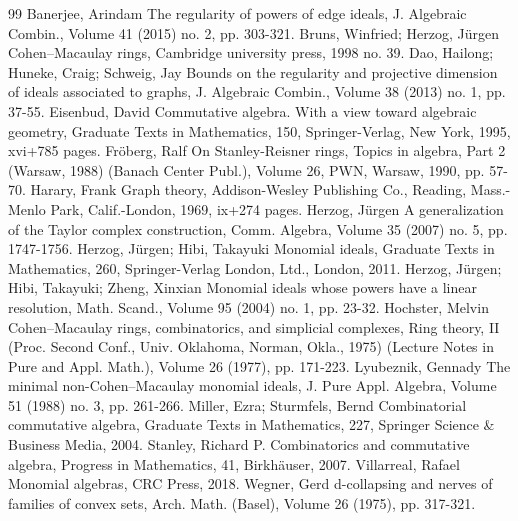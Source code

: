 \begin{thebibliography}{99}
 Banerjee, Arindam The regularity of powers of edge ideals, J. Algebraic Combin., Volume 41 (2015) no. 2, pp. 303-321.
 Bruns, Winfried; Herzog, Jürgen Cohen–Macaulay rings, Cambridge university press, 1998 no. 39.
 Dao, Hailong; Huneke, Craig; Schweig, Jay Bounds on the regularity and projective dimension of ideals associated to graphs, J. Algebraic Combin., Volume 38 (2013) no. 1, pp. 37-55.
 Eisenbud, David Commutative algebra. With a view toward algebraic geometry, Graduate Texts in Mathematics, 150, Springer-Verlag, New York, 1995, xvi+785 pages.
 Fröberg, Ralf On Stanley-Reisner rings, Topics in algebra, Part 2 (Warsaw, 1988) (Banach Center Publ.), Volume 26, PWN, Warsaw, 1990, pp. 57-70.
 Harary, Frank Graph theory, Addison-Wesley Publishing Co., Reading, Mass.-Menlo Park, Calif.-London, 1969, ix+274 pages.
 Herzog, Jürgen A generalization of the Taylor complex construction, Comm. Algebra, Volume 35 (2007) no. 5, pp. 1747-1756.
 Herzog, Jürgen; Hibi, Takayuki Monomial ideals, Graduate Texts in Mathematics, 260, Springer-Verlag London, Ltd., London, 2011.
 Herzog, Jürgen; Hibi, Takayuki; Zheng, Xinxian Monomial ideals whose powers have a linear resolution, Math. Scand., Volume 95 (2004) no. 1, pp. 23-32.
 Hochster, Melvin Cohen–Macaulay rings, combinatorics, and simplicial complexes, Ring theory, II (Proc. Second Conf., Univ. Oklahoma, Norman, Okla., 1975) (Lecture Notes in Pure and Appl. Math.), Volume 26 (1977), pp. 171-223.
 Lyubeznik, Gennady The minimal non-Cohen–Macaulay monomial ideals, J. Pure Appl. Algebra, Volume 51 (1988) no. 3, pp. 261-266.
 Miller, Ezra; Sturmfels, Bernd Combinatorial commutative algebra, Graduate Texts in Mathematics, 227, Springer Science \& Business Media, 2004.
 Stanley, Richard P. Combinatorics and commutative algebra, Progress in Mathematics, 41, Birkhäuser, 2007.
 Villarreal, Rafael Monomial algebras, CRC Press, 2018.
 Wegner, Gerd d-collapsing and nerves of families of convex sets, Arch. Math. (Basel), Volume 26 (1975), pp. 317-321.
\end{thebibliography}
